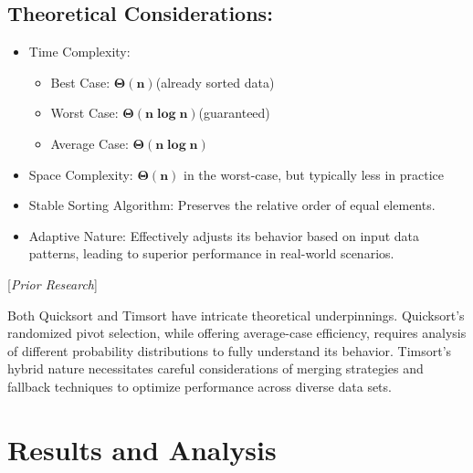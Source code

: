 \documentclass[a4paper, 9pt, twocolumn]{article}
\begin{document}
\subsection*{Theoretical Considerations:}
\begin{itemize}
	\item Time Complexity:
	      \begin{itemize}[label={$\circ$}]
		      \item Best Case: $\boldsymbol{\Theta(n)}$(already sorted data)
		      \item Worst Case: $\boldsymbol{\Theta(n\log n)}$(guaranteed)
		      \item Average Case: $\boldsymbol{\Theta(n\log n)}$
	      \end{itemize}
	\item Space Complexity: $\boldsymbol{\Theta(n)}$ in the worst-case, but typically less in practice
	\item Stable Sorting Algorithm: Preserves the relative order of equal elements.
	\item Adaptive Nature: Effectively adjusts its behavior based on input data patterns, leading to superior performance in real-world scenarios.
\end{itemize}
[\textit{Prior Research}]\cite{sedgewick1978}\cite{mcilroy1993}\cite{hulin2017performance}

Both Quicksort and Timsort have intricate theoretical underpinnings. Quicksort's randomized pivot selection, while offering average-case efficiency, requires analysis of different probability distributions to fully understand its behavior. Timsort's hybrid nature necessitates careful considerations of merging strategies and fallback techniques to optimize performance across diverse data sets.

\newpage
\section{Results and Analysis}
\end{document}
